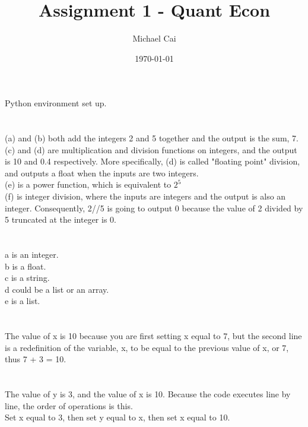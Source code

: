 \documentclass[12pt]{article}
\begin{document}
\title{Assignment 1 - Quant Econ}
\date{\today}
\author{Michael Cai}

\maketitle{}

\section{}
Python environment set up.\\

\section{}
(a) and (b) both add the integers 2 and 5 together and the output is the sum, 7. \\
(c) and (d) are multiplication and division functions on integers, and the output is 10 and 0.4 respectively. More specifically, (d) is called "floating point" division, and outputs a float when the inputs are two integers.\\
(e) is a power function, which is equivalent to $2^5$\\
(f) is integer division, where the inputs are integers and the output is also an integer. Consequently, 2//5 is going to output 0 because the value of 2 divided by 5 truncated at the integer is 0.\\

\section{}
a is an integer.\\
b is a float.\\
c is a string.\\
d could be a list or an array.\\
e is a list.\\

\section{}
The value of x is 10 because you are first setting x equal to 7, but the second line is a redefinition of the variable, x, to be equal to the previous value of x, or 7, thus 7 + 3 = 10.\\

\section{}
The value of y is 3, and the value of x is 10. Because the code executes line by line, the order of operations is this.\\
Set x equal to 3, then set y equal to x, then set x equal to 10.\\
\end{document}
